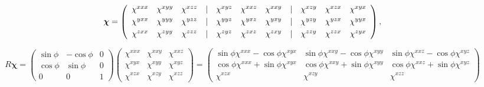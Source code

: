 \documentclass[aps,prb,10pt,letterpaper,notitlepage]{revtex4-1}
\begin{document}
\begin{equation}
\boldsymbol{\chi} =
\left(
\begin{array}{c c c c c c c c c c c}
\chi^{xxx}& \chi^{xyy}& \chi^{xzz}& |& \chi^{xyz}& \chi^{xxz}& \chi^{xxy}& |& \chi^{xzy}& \chi^{xzx}& \chi^{xyx} \\[3pt]
\chi^{yxx}& \chi^{yyy}& \chi^{yzz}& |& \chi^{yyz}& \chi^{yxz}& \chi^{yxy}& |& \chi^{yzy}& \chi^{yzx}& \chi^{yyx} \\[3pt]
\chi^{zxx}& \chi^{zyy}& \chi^{zzz}& |& \chi^{zyz}& \chi^{zxz}& \chi^{zxy}& |& \chi^{zzy}& \chi^{zzx}& \chi^{zyx}
\end{array}
\right)
,
\end{equation}

\begin{equation}
R\boldsymbol{\chi} =
\begin{pmatrix}
\sin\phi & -\cos\phi & 0 \\
\cos\phi &  \sin\phi & 0 \\
    0    &      0    & 1
\end{pmatrix}
\begin{pmatrix}
\chi^{xxx} & \chi^{xxy} & \chi^{xxz} \\
\chi^{xyx} & \chi^{xyy} & \chi^{xyz} \\
\chi^{xzx} & \chi^{xzy} & \chi^{xzz} 
\end{pmatrix}
=
\begin{pmatrix}
\sin\phi\chi^{xxx} - \cos\phi\chi^{xyx} & \sin\phi\chi^{xxy} - \cos\phi\chi^{xyy} & \sin\phi\chi^{xxz} - \cos\phi\chi^{xyz}\\
\cos\phi\chi^{xxx} + \sin\phi\chi^{xyx} & \cos\phi\chi^{xxy} + \sin\phi\chi^{xyy} & \cos\phi\chi^{xxz} + \sin\phi\chi^{xyz}\\
\chi^{xzx} & \chi^{xzy} & \chi^{xzz}  
\end{pmatrix}
\end{equation}
\end{document}
